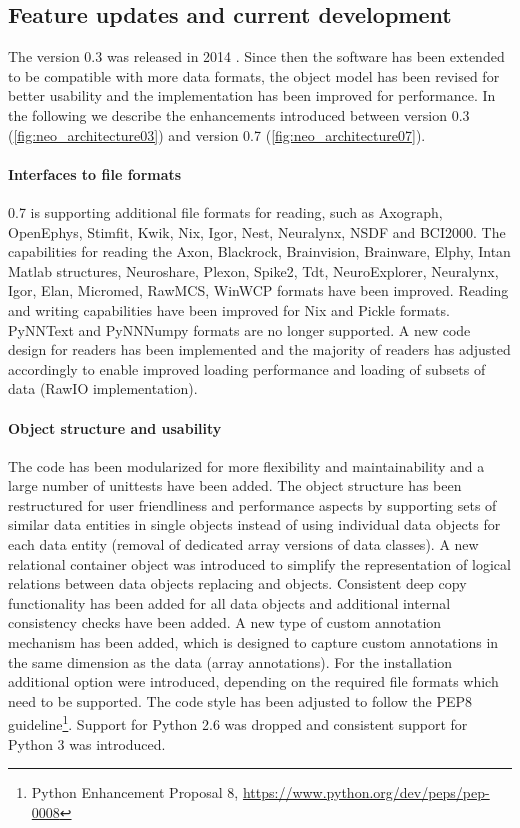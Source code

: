 \subsection{Feature updates and current development}
The  version 0.3 was released in 2014 \citep{Garcia_2014}. Since then the software has been extended to be compatible with more data formats, the object model has been revised for better usability and the implementation has been improved for performance. In the following we describe the enhancements introduced between version 0.3 (\cref{fig:neo_architecture03}) and version 0.7 (\cref{fig:neo_architecture07}).

\paragraph{Interfaces to file formats}
 0.7 is supporting additional file formats for reading, such as Axograph, OpenEphys, Stimfit, Kwik, Nix, Igor, Nest, Neuralynx, NSDF and BCI2000. The capabilities for reading the Axon, Blackrock, Brainvision, Brainware, Elphy, Intan Matlab structures, Neuroshare, Plexon, Spike2, Tdt, NeuroExplorer, Neuralynx, Igor, Elan, Micromed, RawMCS, WinWCP formats have been improved. Reading and writing capabilities have been improved for Nix and Pickle formats. PyNNText and PyNNNumpy formats are no longer supported. A new code design for readers has been implemented and the majority of readers has adjusted accordingly to enable improved loading performance and loading of subsets of data (RawIO implementation). 
\paragraph{Object structure and usability}
The code has been modularized for more flexibility and maintainability and a large number of unittests have been added. The object structure has been restructured for user friendliness and performance aspects by supporting sets of similar data entities in single objects instead of using individual data objects for each data entity (removal of dedicated array versions of data classes). A new relational container object  was introduced to simplify the representation of logical relations between data objects replacing  and  objects. Consistent deep copy functionality has been added for all data objects and additional internal consistency checks have been added. A new type of custom annotation mechanism has been added, which is designed to capture custom annotations in the same dimension as the data (array annotations). For the installation additional option were introduced, depending on the required file formats which need to be supported. The code style has been adjusted to follow the PEP8 guideline\footnote{Python Enhancement Proposal 8, \url{https://www.python.org/dev/peps/pep-0008}}\citep{PEP8StyleGuideforPythonCode_}. Support for Python 2.6 was dropped and consistent support for Python 3 was introduced.


